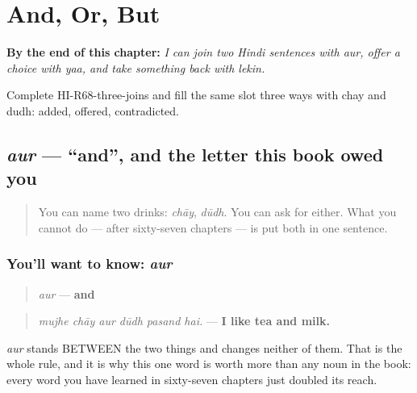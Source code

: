 
\chapter{And, Or, But}
\label{ch:hi-flat-joins}

\begin{chapteropening}
\textbf{By the end of this chapter:} \emph{I can join two Hindi sentences with aur, offer a choice with yaa, and take something back with lekin.}

Complete HI-R68-three-joins and fill the same slot three ways with chay and dudh: added, offered, contradicted.
\end{chapteropening}

\section[\texorpdfstring{\hi{और} (aur)}{और (aur)}]{\emph{aur} — \textquotedblleft{}and\textquotedblright{}, and the letter this book owed you}

\label{lesson:HI-C68-aur}



\begin{quote}
You can name two drinks: \emph{chāy}, \emph{dūdh}. You can ask for either. What you cannot do — after sixty-seven chapters — is put both in one sentence.
\end{quote}

\subsection*{You'll want to know: \emph{aur}}
\begin{quote}
\emph{aur} — \textbf{and}
\end{quote}

\begin{quote}
\emph{mujhe chāy aur dūdh pasand hai.} — \textbf{I like tea and milk.}
\end{quote}

\emph{aur} stands BETWEEN the two things and changes neither of them. That is the whole rule, and it is why this one word is worth more than any noun in the book: every word you have learned in sixty-seven chapters just doubled its reach.

